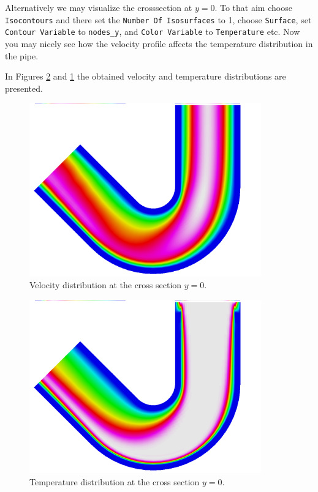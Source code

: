 Alternatively we may visualize the crosssection at $y=0$. To that aim choose 
\texttt{Isocontours} and there set the \texttt{Number Of Isosurfaces} to 1, 
choose \texttt{Surface}, set \texttt{Contour Variable} to \texttt{nodes\_y}, and 
\texttt{Color Variable} to \texttt{Temperature} etc. Now you may nicely see how the 
velocity profile affects the temperature distribution in the pipe.

In Figures \ref{fg:curved_pipe_temp} and \ref{fg:curved_pipe_velo} the obtained velocity and temperature 
distributions are presented. 

\begin{figure}[h]
\centering
\includegraphics[width=10cm, viewport=0 8 1024 750,clip]{curved_pipe_velo_crosssection}
\caption{Velocity distribution at the cross section $y=0$.}\label{fg:curved_pipe_velo}
\end{figure} 

\begin{figure}[h]
\centering
\includegraphics[width=10cm, viewport=0 8 1024 750,clip]{curved_pipe_temp_crosssection}
\caption{Temperature distribution at the cross section $y=0$.}\label{fg:curved_pipe_temp}
\end{figure} 



\hfill
